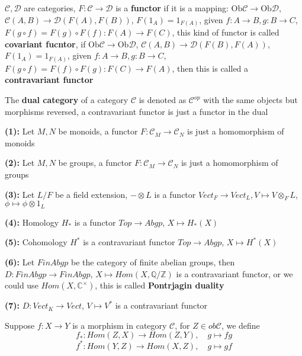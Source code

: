 \documentclass[../main.tex]{subfiles}
\begin{document}
\begin{definition}
$\mathscr{C},\mathscr{D}$ are categories, $F:\mathscr{C}\to\mathscr{D}$ is a \textbf{functor} if it is a mapping: $\mathrm{Ob}\mathscr{C}\to\mathrm{Ob}\mathscr{D}$, $\mathscr{C}(A,B)\to\mathscr{D}(F(A),F(B))$, $F(1_A)=1_{F(A)}$, given $f:A\to B,g:B\to C$, $F(g\circ f)=F(g)\circ F(f):F(A)\to F(C)$, this kind of functor is called \textbf{covariant fucntor}, if $\mathrm{Ob}\mathscr{C}\to\mathrm{Ob}\mathscr{D}$, $\mathscr{C}(A,B)\to\mathscr{D}(F(B),F(A))$, $F(1_A)=1_{F(A)}$, given $f:A\to B,g:B\to C$, $F(g\circ f)=F(f)\circ F(g):F(C)\to F(A)$, then this is called a \textbf{contravariant functor} \par
The \textbf{dual category} of a category $\mathscr{C}$ is denoted as $\mathscr{C}^{op}$ with the same objects but morphisms reversed, a contravariant functor is just a functor in the dual
\end{definition}

\begin{example}
\textbf{(1): }Let $M,N$ be monoids, a functor $F:\mathscr C_M\to\mathscr C_N$ is just a homomorphism of monoids \par
\textbf{(2): }Let $M,N$ be groups, a functor $F:\mathscr C_M\to\mathscr C_N$ is just a homomorphism of groups \par
\textbf{(3): }Let $L/F$ be a field extension, $-\otimes L$ is a functor $Vect_F\to Vect_L, V\mapsto V\otimes_F L$, $\phi\mapsto\phi\otimes 1_L$ \par
\textbf{(4): }Homology $H_*$ is a functor $Top\to Abgp$, $X\mapsto H_*(X)$ \par
\textbf{(5): }Cohomology $H^*$ is a contravariant functor $Top\to Abgp$, $X\mapsto H^*(X)$ \par
\textbf{(6): }Let $FinAbgp$ be the category of finite abelian groups, then $D:FinAbgp\to FinAbgp$, $X\mapsto Hom(X,\mathbb Q/\mathbb Z)$ is a contravariant functor, or we could use $Hom(X,\mathbb C^\times)$, this is called \textbf{Pontrjagin duality} \par
\textbf{(7): }$D:Vect_K\to Vect$, $V\mapsto V^*$ is a contravariant functor
\end{example}

\begin{notation}
Suppose $f:X\to Y$ is a morphism in category $\mathscr C$, for $Z\in ob\mathscr C$, we define
\[f_*:Hom(Z,X)\to Hom(Z,Y),\quad g\mapsto fg\]
\[f^*:Hom(Y,Z)\to Hom(X,Z),\quad g\mapsto gf\]
\end{notation}
\end{document}
